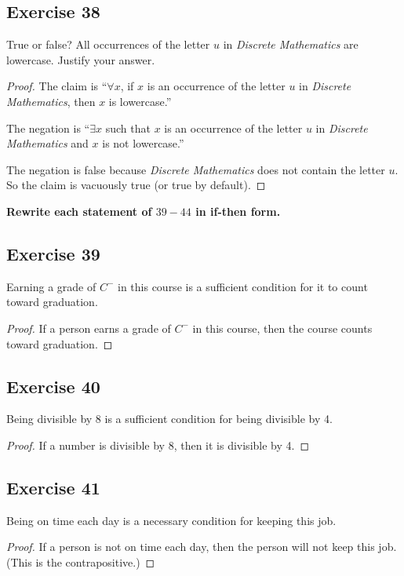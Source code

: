 \documentclass[14pt]{extarticle}
\newcommand{\fa}{\forall}
\newcommand{\te}{\exists}
\begin{document}
\subsection{Exercise 38}
True or false? All occurrences of the letter $u$ in {\it Discrete Mathematics} are lowercase. Justify your answer.

\begin{proof}
    The claim is “$\fa x$, if $x$ is an occurrence of the letter $u$ in {\it Discrete Mathematics}, then $x$ is lowercase.”

    The negation is “$\te x$ such that $x$ is an occurrence of the letter $u$ in {\it Discrete Mathematics} and $x$ is not lowercase.”

    The negation is false because {\it Discrete Mathematics} does not contain the letter $u$. So the claim is vacuously true (or true by default).
\end{proof}

{\bf \color{cyan} Rewrite each statement of $39-44$ in if-then form.}

\subsection{Exercise 39}
Earning a grade of $C^-$ in this course is a sufficient condition for it to count toward graduation.

\begin{proof}
    If a person earns a grade of $C^-$ in this course, then the course counts toward graduation.
\end{proof}

\subsection{Exercise 40}
Being divisible by 8 is a sufficient condition for being divisible by 4.

\begin{proof}
    If a number is divisible by 8, then it is divisible by 4.
\end{proof}

\subsection{Exercise 41}
Being on time each day is a necessary condition for keeping this job.

\begin{proof}
    If a person is not on time each day, then the person will
    not keep this job. (This is the contrapositive.)
\end{proof}
\end{document}
